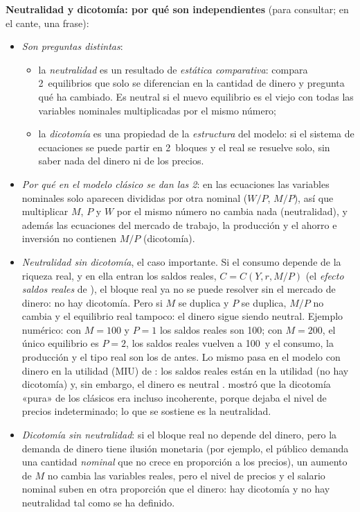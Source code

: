\documentclass[11pt]{article}
\begin{document}
\begin{anotaciones}
\textbf{Neutralidad y dicotomía: por qué son independientes} (para consultar; en el cante, una frase):
\begin{itemize}
\item \emph{Son preguntas distintas}:
  \begin{itemize}
  \item la \emph{neutralidad} es un resultado de \emph{estática comparativa}: compara 2~equilibrios que solo se diferencian en la cantidad de dinero y pregunta qué ha cambiado. Es neutral si el nuevo equilibrio es el viejo con todas las variables nominales multiplicadas por el mismo número;
  \item la \emph{dicotomía} es una propiedad de la \emph{estructura} del modelo: si el sistema de ecuaciones se puede partir en 2~bloques y el real se resuelve solo, sin saber nada del dinero ni de los precios.
  \end{itemize}
\item \emph{Por qué en el modelo clásico se dan las 2}: en las ecuaciones las variables nominales solo aparecen divididas por otra nominal ($W/P$, $M/P$), así que multiplicar $M$, $P$ y $W$ por el mismo número no cambia nada (neutralidad), y además las ecuaciones del mercado de trabajo, la producción y el ahorro e inversión no contienen $M/P$ (dicotomía).
\item \emph{Neutralidad sin dicotomía}, el caso importante. Si el consumo depende de la riqueza real, y en ella entran los saldos reales, $C=C(Y,r,M/P)$ (el \emph{efecto saldos reales} de \textcite{Patinkin1956Money}), el bloque real ya no se puede resolver sin el mercado de dinero: no hay dicotomía. Pero si $M$ se duplica y $P$ se duplica, $M/P$ no cambia y el equilibrio real tampoco: el dinero sigue siendo neutral. Ejemplo numérico: con $M=100$ y $P=1$ los saldos reales son 100; con $M=200$, el único equilibrio es $P=2$, los saldos reales vuelven a 100~y el consumo, la producción y el tipo real son los de antes. Lo mismo pasa en el modelo con dinero en la utilidad (MIU) de \textcite{Sidrauski1967Rational}: los saldos reales están en la utilidad (no hay dicotomía) y, sin embargo, el dinero es neutral .  mostró que la dicotomía «pura» de los clásicos era incluso incoherente, porque dejaba el nivel de precios indeterminado; lo que se sostiene es la neutralidad.
\item \emph{Dicotomía sin neutralidad}: si el bloque real no depende del dinero, pero la demanda de dinero tiene ilusión monetaria (por ejemplo, el público demanda una cantidad \emph{nominal} que no crece en proporción a los precios), un aumento de $M$ no cambia las variables reales, pero el nivel de precios y el salario nominal suben en otra proporción que el dinero: hay dicotomía y no hay neutralidad tal como se ha definido.

\end{itemize}
\end{anotaciones}
\end{document}
